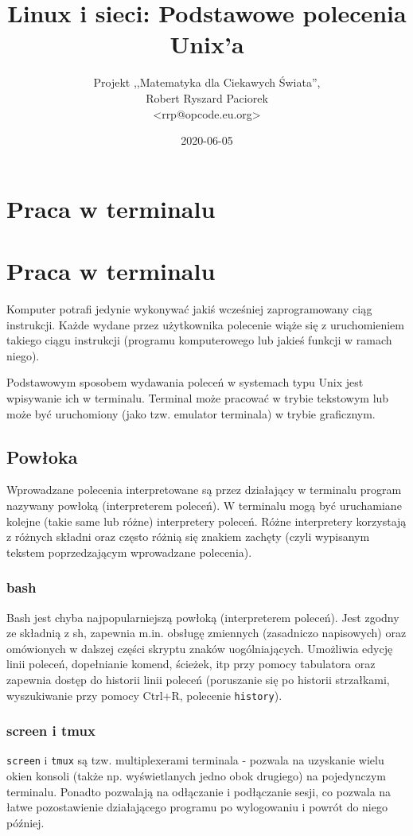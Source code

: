 \documentclass{pdfBooklets}
\title{Linux i sieci: Podstawowe polecenia Unix'a}
\author{%
	Projekt ,,Matematyka dla Ciekawych Świata'',\\
	Robert Ryszard Paciorek\\\normalsize\ttfamily <rrp@opcode.eu.org>
}
\date  {2020-06-05}
\begin{document}
\maketitle

\section{Praca w terminalu}

\section{Praca w terminalu}

Komputer potrafi jedynie wykonywać jakiś wcześniej zaprogramowany ciąg instrukcji.
Każde wydane przez użytkownika polecenie wiąże się z uruchomieniem takiego ciągu instrukcji (programu komputerowego lub jakieś funkcji w ramach niego).

Podstawowym sposobem wydawania poleceń w systemach typu Unix jest wpisywanie ich w terminalu.
Terminal może pracować w trybie tekstowym lub może być uruchomiony (jako tzw. emulator terminala) w trybie graficznym.

\subsection{Powłoka}

Wprowadzane polecenia interpretowane są przez działający w terminalu program nazywany powłoką (interpreterem poleceń).
W terminalu mogą być uruchamiane kolejne (takie same lub różne) interpretery poleceń.
Różne interpretery korzystają z różnych składni oraz często różnią się znakiem zachęty (czyli wypisanym tekstem poprzedzającym wprowadzane polecenia).

\subsubsection{bash}
Bash jest chyba najpopularniejszą powłoką (interpreterem poleceń).
Jest zgodny ze składnią z sh, zapewnia m.in. obsługę zmiennych (zasadniczo napisowych) oraz omówionych w dalszej części skryptu znaków uogólniających.
Umożliwia edycję linii poleceń, dopełnianie komend, ścieżek, itp przy pomocy tabulatora oraz zapewnia dostęp do historii linii poleceń (poruszanie się po historii strzałkami, wyszukiwanie przy pomocy Ctrl+R, polecenie \texttt{history}).

\subsubsection{screen i tmux}
\texttt{screen} i \texttt{tmux} są tzw. multiplexerami terminala - pozwala na uzyskanie wielu okien konsoli (także np. wyświetlanych jedno obok drugiego) na pojedynczym terminalu.
Ponadto pozwalają na odłączanie i podłączanie sesji, co pozwala na łatwe pozostawienie działającego programu po wylogowaniu i powrót do niego później.
\end{document}

